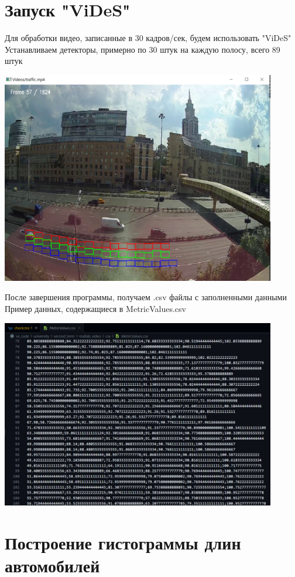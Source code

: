 \documentclass[a4paper,12pt]{article}
\begin{document}
\newpage
\section*{Запуск "ViDeS"}
Для обработки видео, записанные в 30 кадров/сек, будем использовать "ViDeS"\\
Устанавливаем детекторы, примерно по 30 штук на каждую полосу, всего 89 штук
\begin{center}
\includegraphics[width=0.9\textwidth]{vides_30_detectors.jpg}
\end{center}
После завершения программы, получаем .csv файлы с заполненными данными
Пример данных, содержащиеся в MetricValues.csv
\begin{center}
\includegraphics[width=0.9\textwidth]{vides_data.jpg}
\end{center}


\newpage
\section*{Построение гистограммы длин автомобилей}
\end{document}
